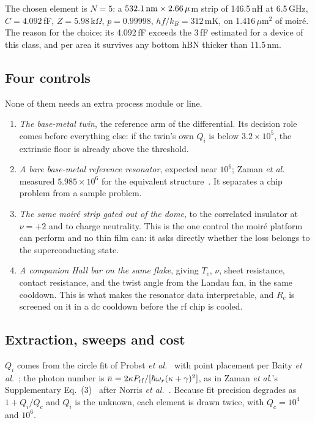 \documentclass[aps,prb,reprint,superscriptaddress,longbibliography]{revtex4-2}
\begin{document}
The chosen element is $N = 5$: a $532.1\,{\rm nm} \times 2.66\,\mu$m
strip of 146.5\,nH at 6.5\,GHz, $C = 4.092$\,fF, $Z = 5.98$\,k$\Omega$,
$p = 0.99998$, $hf/k_B = 312$\,mK, on 1.416\,$\mu$m$^2$ of moir\'e. The
reason for the choice: its 4.092\,fF exceeds the 3\,fF estimated for a
device of this class, and per area it survives any bottom hBN thicker
than 11.5\,nm.

\subsection{Four controls}

None of them needs an extra process module or line.
\begin{enumerate}
\item \emph{The base-metal twin}, the reference arm of the differential.
Its decision role comes before everything else: if the twin's own $Q_i$
is below $3.2 \times 10^{5}$, the extrinsic floor is already above the
threshold.
\item \emph{A bare base-metal reference resonator}, expected near
$10^{6}$; Zaman \emph{et al.} measured $5.985 \times 10^{6}$ for the
equivalent structure~\cite{Zaman2026}. It separates a chip problem from
a sample problem.
\item \emph{The same moir\'e strip gated out of the dome}, to the
correlated insulator at $\nu = +2$ and to charge neutrality. This is the
one control the moir\'e platform can perform and no thin film can: it
asks directly whether the loss belongs to the superconducting state.
\item \emph{A companion Hall bar on the same flake}, giving $T_c$, $\nu$,
sheet resistance, contact resistance, and the twist angle from the
Landau fan, in the same cooldown. This is what makes the resonator data
interpretable, and $R_c$ is screened on it in a dc cooldown before the
rf chip is cooled.
\end{enumerate}

\subsection{Extraction, sweeps and cost}

$Q_i$ comes from the circle fit of Probst \emph{et
al.}~\cite{Probst2015} with point placement per Baity \emph{et
al.}~\cite{Baity2024}; the photon number is $\bar n = 2\kappa P_{\rm
rf}/[\hbar\omega_r(\kappa+\gamma)^2]$, as in Zaman \emph{et al.}'s
Supplementary Eq.~(3)~\cite{Zaman2026} after Norris \emph{et
al.}~\cite{Norris2024}. Because fit precision degrades as
$1 + Q_i/Q_c$ and $Q_i$ is the unknown, each element is drawn twice,
with $Q_c = 10^{4}$ and $10^{6}$.
\end{document}
